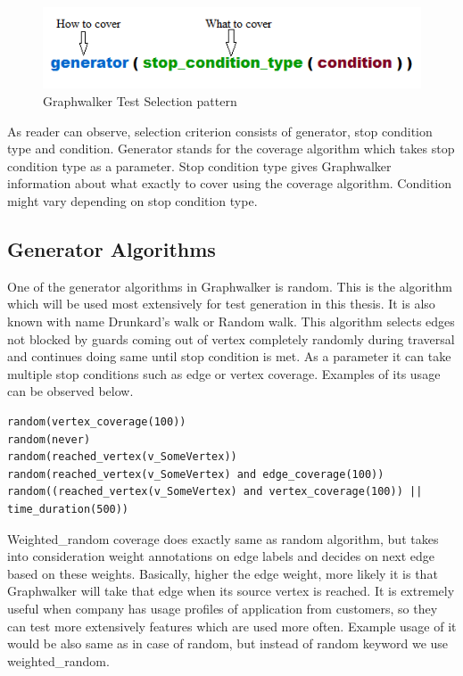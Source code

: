 \begin{figure} [htbp!]
	\centering
					\includegraphics[width=1\textwidth]{figures/Graphwalker_testselection_example.png}
					\caption{\label{Fig:raphwalker_testselection_example} Graphwalker Test Selection pattern}
\end{figure}
\par
As reader can observe, selection criterion consists of generator, stop condition type and condition. Generator stands for the coverage algorithm which takes stop condition type as a parameter. Stop condition type gives Graphwalker information about what exactly to cover using the coverage algorithm. Condition might vary depending on stop condition type.

\subsection{Generator Algorithms}
\par
One of the generator algorithms in Graphwalker is random. This is the algorithm which will be used most extensively for test generation in this thesis. It is also known with name Drunkard's walk or Random walk. This algorithm selects edges not blocked by guards coming out of vertex completely randomly during traversal and continues doing same until stop condition is met. As a parameter it can take multiple stop conditions such as edge or vertex coverage. Examples of its usage can be observed below. 
\begin{lstlisting}
random(vertex_coverage(100))
random(never)
random(reached_vertex(v_SomeVertex))
random(reached_vertex(v_SomeVertex) and edge_coverage(100))
random((reached_vertex(v_SomeVertex) and vertex_coverage(100)) || time_duration(500))
\end{lstlisting}

\par
Weighted\_random coverage does exactly same as random algorithm, but takes into consideration weight annotations on edge labels and decides on next edge based on these weights. Basically, higher the edge weight, more likely it is that Graphwalker will take that edge when its source vertex is reached. It is extremely useful when company has usage profiles of application from customers, so they can test more extensively features which are used more often. Example usage of it would be also same as in case of random, but instead of random keyword we use weighted\_random.

